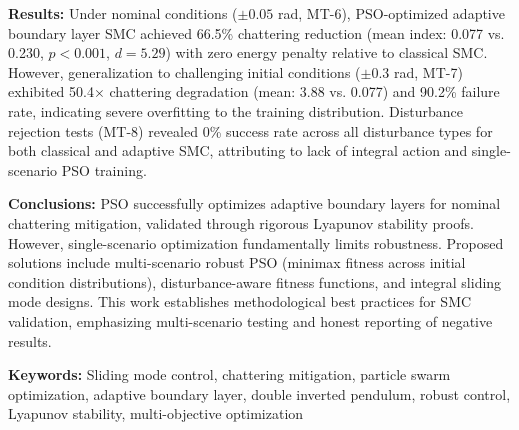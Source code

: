 \noindent
\textbf{Results:}
Under nominal conditions ($\pm0.05$ rad, MT-6), PSO-optimized adaptive boundary layer SMC achieved 66.5\% chattering reduction (mean index: 0.077 vs. 0.230, $p<0.001$, $d=5.29$) with zero energy penalty relative to classical SMC. However, generalization to challenging initial conditions ($\pm0.3$ rad, MT-7) exhibited 50.4$\times$ chattering degradation (mean: 3.88 vs. 0.077) and 90.2\% failure rate, indicating severe overfitting to the training distribution. Disturbance rejection tests (MT-8) revealed 0\% success rate across all disturbance types for both classical and adaptive SMC, attributing to lack of integral action and single-scenario PSO training.

\vspace{0.5cm}

\noindent
\textbf{Conclusions:}
PSO successfully optimizes adaptive boundary layers for nominal chattering mitigation, validated through rigorous Lyapunov stability proofs. However, single-scenario optimization fundamentally limits robustness. Proposed solutions include multi-scenario robust PSO (minimax fitness across initial condition distributions), disturbance-aware fitness functions, and integral sliding mode designs. This work establishes methodological best practices for SMC validation, emphasizing multi-scenario testing and honest reporting of negative results.

\vspace{0.5cm}

\noindent
\textbf{Keywords:}
Sliding mode control, chattering mitigation, particle swarm optimization, adaptive boundary layer, double inverted pendulum, robust control, Lyapunov stability, multi-objective optimization

\clearpage
